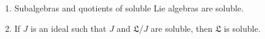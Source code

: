 \begin{enumerate}
	\item Subalgebras and quotients of soluble Lie algebras are soluble.
	\item If $J$ is an ideal such that $J$ and $\mathfrak{L}/J$ are soluble,
		then $\mathfrak{L}$ is soluble.
\end{enumerate}
